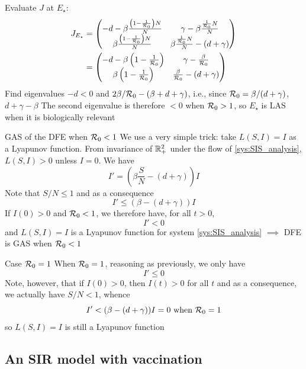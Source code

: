 \documentclass[aspectratio=43]{beamer}
\begin{document}
\begin{frame}
Evaluate $J$ at $E_\star$:
\begin{align*}
J_{E_\star} &=
\begin{pmatrix}
-d -\beta \frac {\left(1-\frac{1}{\mathcal{R}_0}\right)N}{N} & \gamma-\beta\frac {\frac{1}{\mathcal{R}_0}N}{N} \\
\beta \frac {\left(1-\frac{1}{\mathcal{R}_0}\right)N}{N} & \beta\frac {\frac{1}{\mathcal{R}_0}N}{N}-(d+\gamma)
\end{pmatrix} \\
 &=
\begin{pmatrix}
-d -\beta \left(1-\frac{1}{\mathcal{R}_0}\right) & \gamma-\frac{\beta}{\mathcal{R}_0} \\
\beta \left(1-\frac{1}{\mathcal{R}_0}\right) & \frac{\beta}{\mathcal{R}_0}-(d+\gamma)
\end{pmatrix}
\end{align*}
\vfill
Find eigenvalues $-d<0$ and $2\beta/\mathcal{R}_0-(\beta+d+\gamma)$, i.e., since $\mathcal{R}_0=\beta/(d+\gamma)$, $d+\gamma-\beta$
\vfill
The second eigenvalue is therefore $<0$ when $\mathcal{R}_0>1$, so $E_\star$ is LAS when it is biologically relevant
\end{frame}

\begin{frame}{GAS of the DFE when $\mathcal{R}_0<1$}
We use a very simple trick: take $L(S,I)=I$ as a Lyapunov function. From invariance of $\mathbb{R}_+^2$ under the flow of \eqref{sys:SIS_analysis}, $L(S,I)>0$ unless $I=0$. We have
$$
I' = \left(\beta \frac SN-(d+\gamma)\right)I
$$
Note that $S/N\leq 1$ and as a consequence
$$
I' \leq \left(\beta-(d+\gamma)\right)I
$$
If $I(0)>0$ and $\mathcal{R}_0<1$, we therefore have, for all $t>0$,
$$
I'<0
$$
and $L(S,I)=I$ is a Lyapunov function for system \eqref{sys:SIS_analysis} $\implies$ DFE is GAS when $\mathcal{R}_0<1$
\end{frame}

\begin{frame}{Case $\mathcal{R}_0=1$}
When $\mathcal{R}_0=1$, reasoning as previously, we only have
$$
I'\leq 0
$$
Note, however, that if $I(0)>0$, then $I(t)>0$ for all $t$ and as a consequence, we actually have $S/N<1$, whence 
$$
I'<(\beta-(d+\gamma))I=0 \text{ when }\mathcal{R}_0=1
$$
so $L(S,I)=I$ is still a Lyapunov function
\end{frame}

\subsection{An SIR model with vaccination}
\end{document}
